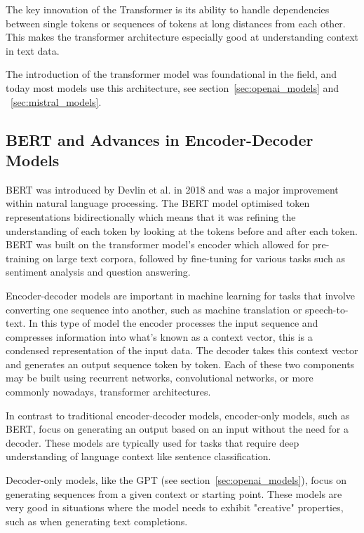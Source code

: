 The key innovation of the Transformer is its ability to handle dependencies between single tokens or sequences of tokens at long distances from each other. This makes the transformer architecture especially good at understanding context in text data.


The introduction of the transformer model was foundational in the field, and today most models use this architecture, see section~\ref{sec:openai_models} and ~\ref{sec:mistral_models}.


\subsection{BERT and Advances in Encoder-Decoder Models}
\label{sec:bert_and_encoder_decoder}


\gls{BERT} was introduced by Devlin et al. \cite{devlin_bert_2019} in 2018 and was a major improvement within natural language processing. The \gls{BERT} model optimised token representations bidirectionally which means that it was refining the understanding of each token by looking at the tokens before and after each token. \gls{BERT} was built on the transformer model’s encoder which allowed for pre-training on large text corpora, followed by fine-tuning for various tasks such as sentiment analysis and question answering.


Encoder-decoder models are important in machine learning for tasks that involve converting one sequence into another, such as machine translation or speech-to-text. In this type of model the encoder processes the input sequence and compresses information into what’s known as a context vector, this is a condensed representation of the input data. The decoder takes this context vector and generates an output sequence token by token. Each of these two components may be built using recurrent networks, convolutional networks, or more commonly nowadays, transformer architectures.


In contrast to traditional encoder-decoder models, encoder-only models, such as \gls{BERT}, focus on generating an output based on an input without the need for a decoder. These models are typically used for tasks that require deep understanding of language context like sentence classification.


Decoder-only models, like the \gls{GPT} (see section~\ref{sec:openai_models}), focus on generating sequences from a given context or starting point. These models are very good in situations where the model needs to exhibit "creative" properties, such as when generating text completions.


